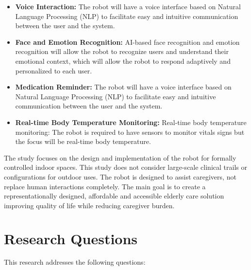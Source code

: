 \begin{itemize}
    \item \textbf{Voice Interaction:} The robot will have a voice interface based on Natural Language Processing (NLP) to facilitate easy and intuitive communication between the user and the system.
    
    \item \textbf{Face and Emotion Recognition:} AI-based face recognition and emotion recognition will allow the robot to recognize users and understand their emotional context, which will allow the robot to respond adaptively and personalized to each user.
    
    \item \textbf{Medication Reminder:} The robot will have a voice interface based on Natural Language Processing (NLP) to facilitate easy and intuitive communication between the user and the system.
    
    \item \textbf{Real-time Body Temperature Monitoring:}  Real-time body temperature monitoring: The robot is required to have sensors to monitor vitals signs but the focus will be real-time body temperature.
\end{itemize}

The study focuses on the design and implementation of the robot for formally controlled indoor spaces. This study does not consider large-scale clinical trails or configurations for outdoor uses. The robot is designed to assist caregivers, not replace human interactions completely. The main goal is to create a representationally designed, affordable and accessible elderly care solution improving quality of life while reducing caregiver burden.





\section{Research Questions}
\label{sec:Research Question}

This research addresses the following questions:

